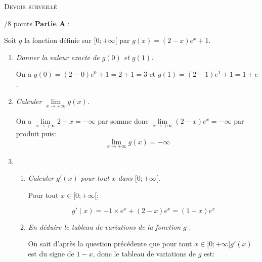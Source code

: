 \documentclass[a4paper]{article}
\begin{document}
\begin{center}
  {\scshape\LARGE Devoir surveillé \par}
  \vspace{0.5cm}
\end{center}

\NomPrenom{}
\medskip

\begin{exerciceinterro}{\hspace{2cm}/8 points}{}
\textbf{Partie A} :

\medskip

Soit $g$ la fonction définie sur $[0;+\infty[$ par $g(x)=(2-x)e^x+1$.

\begin{enumerate}
	\item \textit{Donner la valeur exacte de $g(0)$ et $g(1)$.}
	
	On a $g(0)=(2-0)e^0+1=2+1=3$ et $g(1)=(2-1)e^1+1=1+e$.
	



	\item \textit{Calculer $\lim\limits_{x \to +\infty} g(x)$}.
	
	On a $\lim\limits_{x \to +\infty} 2-x=-\infty$ par somme donc $\lim\limits_{x \to +\infty} (2-x)e^x=-\infty$ par produit 
puis:
$$\lim\limits_{x \to +\infty} g(x)=-\infty$$




	\item \begin{enumerate}
		\item \textit{Calculer $g'(x)$ pour tout $x$ dans $[0;+\infty[$.}
		
		Pour tout $x\in[0;+\infty[$:

		$$g'(x)=-1\times e^x+(2-x)e^x=(1-x)e^x$$
		




		\item \textit{En déduire le tableau de variations de la fonction $g$ }.
	
		On sait d'après la question précédente que pour tout $x\in[0;+\infty[$$g'(x)$ est du signe de $1-x$, donc le tableau de variations de $g$ est:

		\begin{center}
		\end{center}
		

\end{enumerate}
\end{enumerate}
\end{exerciceinterro}
\end{document}
